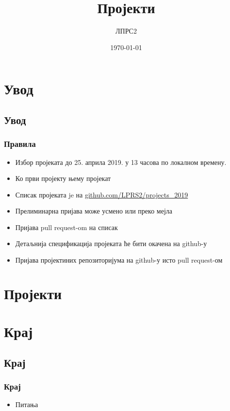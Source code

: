 \documentclass[compress, t]{beamer}
\title{Пројекти}
\author{ЛПРС2}
\institute{РТ-РК}
\date{\today}
\begin{document}



\frame{\titlepage}

\section{Увод}
\subsection{Увод}
\begin{frame}
	\frametitle{\textbf{Правила}}
	
	\begin{itemize}
		\item Избор пројеката до 25. априла 2019.
			у 13 часова по локалном времену.
		\item Ко први пројекту њему пројекат
		\item Списак пројеката je на \url{github.com/LPRS2/projects_2019}
		\item Прелиминарна пријава може усмено или преко мејла
		\item Пријава pull request-om на списак
		\item Детаљнија спецификација пројеката ће бити окачена на github-у
		\item Пријава пројектиних репозиторијума на github-у
			исто pull request-ом
	\end{itemize}
\end{frame}

\section{Пројекти}





\section{Крај}
\subsection{Крај}
\begin{frame}
	\frametitle{\textbf{Крај}}
	\begin{itemize}
		\item Питања
	\end{itemize}
\end{frame}

\end{document}
